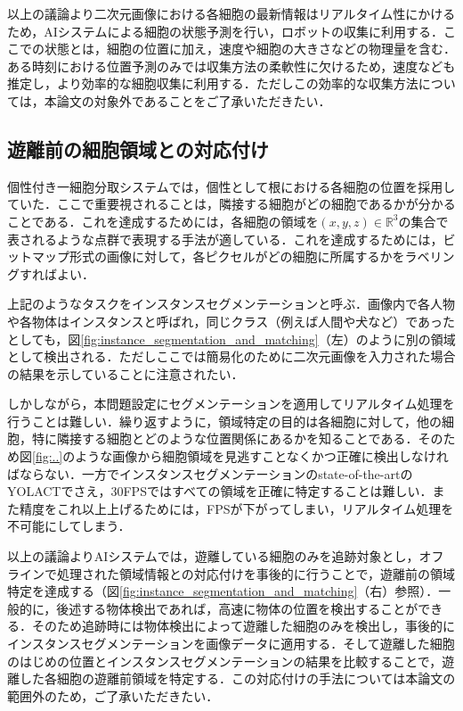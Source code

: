     以上の議論より二次元画像における各細胞の最新情報はリアルタイム性にかけるため，AIシステムによる細胞の状態予測を行い，ロボットの収集に利用する．ここでの状態とは，細胞の位置に加え，速度や細胞の大きさなどの物理量を含む．ある時刻における位置予測のみでは収集方法の柔軟性に欠けるため，速度なども推定し，より効率的な細胞収集に利用する．ただしこの効率的な収集方法については，本論文の対象外であることをご了承いただきたい．

    \subsection{遊離前の細胞領域との対応付け}

    個性付き一細胞分取システムでは，個性として根における各細胞の位置を採用していた．ここで重要視されることは，隣接する細胞がどの細胞であるかが分かることである．これを達成するためには，各細胞の領域を${(x, y, z)} \in \mathbb{R}^3$の集合で表されるような点群で表現する手法が適している．これを達成するためには，ビットマップ形式の画像に対して，各ピクセルがどの細胞に所属するかをラベリングすればよい．

    上記のようなタスクをインスタンスセグメンテーション\cite{hafiz2020survey}と呼ぶ．画像内で各人物や各物体はインスタンスと呼ばれ，同じクラス（例えば人間や犬など）であったとしても，図\ref{fig:instance_segmentation_and_matching}（左）のように別の領域として検出される．ただしここでは簡易化のために二次元画像を入力された場合の結果を示していることに注意されたい．

    しかしながら，本問題設定にセグメンテーションを適用してリアルタイム処理を行うことは難しい．繰り返すように，領域特定の目的は各細胞に対して，他の細胞，特に隣接する細胞とどのような位置関係にあるかを知ることである．そのため図\ref{fig:..}のような画像から細胞領域を見逃すことなくかつ正確に検出しなければならない．一方でインスタンスセグメンテーションのstate-of-the-artのYOLACT\cite{Bolya_2019_ICCV}でさえ，30FPSではすべての領域を正確に特定することは難しい．また精度をこれ以上上げるためには，FPSが下がってしまい，リアルタイム処理を不可能にしてしまう．

    以上の議論よりAIシステムでは，遊離している細胞のみを追跡対象とし，オフラインで処理された領域情報との対応付けを事後的に行うことで，遊離前の領域特定を達成する（図\ref{fig:instance_segmentation_and_matching}（右）参照）．一般的に，後述する物体検出であれば，高速に物体の位置を検出することができる．そのため追跡時には物体検出によって遊離した細胞のみを検出し，事後的にインスタンスセグメンテーションを画像データに適用する．そして遊離した細胞のはじめの位置とインスタンスセグメンテーションの結果を比較することで，遊離した各細胞の遊離前領域を特定する．この対応付けの手法については本論文の範囲外のため，ご了承いただきたい．

